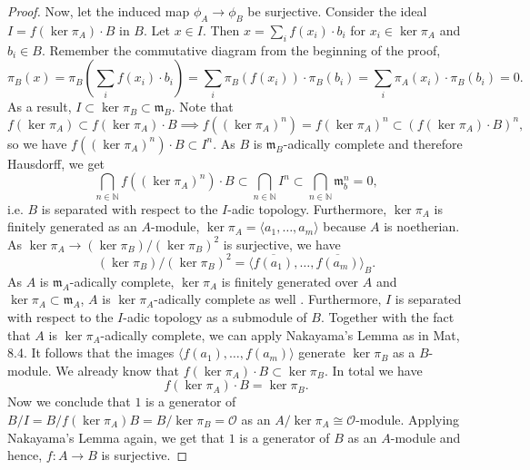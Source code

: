 \documentclass{article}
\theoremstyle{plain}%
\theoremstyle{definition}
\theoremstyle{remark}
\begin{document}
\begin{proof}
    Now, let the induced map \(\phi_A \to \phi_B\) be surjective. 
    Consider the ideal \(I = f(\ker \pi_A) \cdot B\) in \(B\).
    Let \(x \in I\). Then \(x = \sum_i f(x_i) \cdot b_i\) for \(x_i \in \ker \pi_A\) and \(b_i \in B\).
    Remember the commutative diagram from the beginning of the proof,
    \[
        \pi_B(x) = \pi_B\left(\sum_i f(x_i)\cdot b_i\right) 
        = \sum_i \pi_B(f(x_i))\cdot \pi_B(b_i) 
        = \sum_i\pi_A(x_i)\cdot \pi_B(b_i) = 0. 
    \]
    As a result, \(I \subset \ker \pi_B \subset \mathfrak{m}_B\).
    Note that
    \[
        f(\ker \pi_A) \subset f(\ker \pi_A)\cdot B \implies f((\ker \pi_A)^n) 
        = f(\ker \pi_A)^n \subset (f(\ker \pi_A)\cdot B)^n,
    \]
    so we have \(f((\ker \pi_A)^n)\cdot B \subset I^n\).
    As \(B\) is \(\mathfrak{m}_B\)-adically complete and therefore Hausdorff, we get
    \[
        \bigcap_{n \in \mathbb N} f((\ker \pi_A)^n) \cdot B \subset \bigcap_{n \in \mathbb N} I^n 
        \subset \bigcap_{n \in \mathbb N} \mathfrak{m}_b^n = 0,
    \]
    i.e. \(\!B\) is separated with respect to the \(I\)-adic topology.
    Furthermore, \(\ker \pi_A\) is finitely generated as an \(A\)-module, 
    \(\ker \pi_A = \langle a_1, \dots, a_m\rangle\) because \(A\) is noetherian. 
    As \(\ker \pi_A \to (\ker \pi_B)/(\ker \pi_B)^2\) is surjective, we have 
    \[(\ker \pi_B)/(\ker \pi_B)^2 = \langle \overline{f(a_1)}, \dots, \overline{f(a_m)}\rangle_B.\]
    As \(A\) is \(\mathfrak{m}_A\)-adically complete, \(\ker \pi_A\) is finitely generated over \(A\)
    and \(\ker \pi_A \subset \mathfrak{m}_A\), \(A\) is \(\ker \pi_A\)-adically complete as well
    \cite[cf.][\href{https://stacks.math.columbia.edu/tag/090T}{lemma 10.96.8}]{stacks-project}.
    Furthermore, \(I\) is separated with respect to the \(I\)-adic topology 
    as a submodule of \(B\). Together with the fact that \(A\) is \(\ker \pi_A\)-adically complete,
    we can apply Nakayama's Lemma as in Mat, 8.4. 
    It follows that the images \(\langle f(a_1), \dots, f(a_m)\rangle\) generate \(\ker \pi_B\)
    as a \(B\)-module. We already know that \(f(\ker \pi_A) \cdot B \subset \ker \pi_B\). 
    In total we have
    \[
        f(\ker \pi_A) \cdot B = \ker \pi_B.
    \]
    Now we conclude that \(1\) is a generator of \(B/I = B/f(\ker \pi_A) B = B/\ker \pi_B = \mathcal{O}\) as an 
    \(A/\ker \pi_A \cong \mathcal{O}\)-module.
    Applying Nakayama's Lemma again, we get that \(1\) is a generator of \(B\) as an \(A\)-module 
    and hence, \(f\colon A \to B\) is surjective.
\end{proof}
\end{document}
